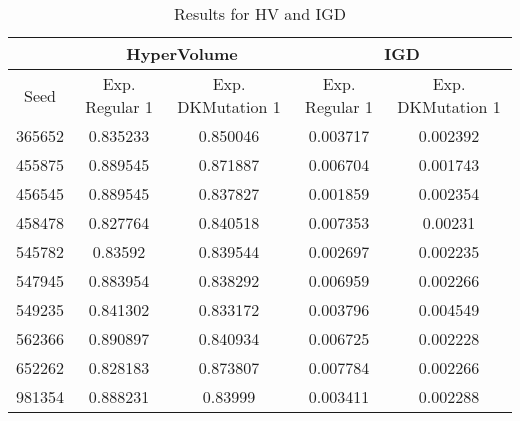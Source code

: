 \documentclass{article}
\begin{document}
 \begin{table}[h]
\caption{Results for HV and IGD}
 \label{table:result HV and IGD}
 
\begin{tabular}{c|cc|cc}  \hline
\multicolumn{1}{l}{} & \multicolumn{2}{c}{HyperVolume}    & \multicolumn{2}{c}{IGD}           \\ \hline 
Seed                 & Exp. Regular 1 & Exp. DKMutation 1 & Exp. Regular 1 & Exp. DKMutation 1 \\ \hline
365652               &  0.835233       & \cellcolor[gray]{0.7}0.850046          & 0.003717       & \cellcolor[gray]{0.7}0.002392          \\
455875               & \cellcolor[gray]{0.7}0.889545       & 0.871887          & 0.006704       & \cellcolor[gray]{0.7}0.001743          \\
456545               & \cellcolor[gray]{0.7}0.889545       & 0.837827          &\cellcolor[gray]{0.7} 0.001859       & 0.002354          \\
458478               & 0.827764       & \cellcolor[gray]{0.7}0.840518          & 0.007353       & \cellcolor[gray]{0.7}0.00231           \\
545782               & 0.83592        & \cellcolor[gray]{0.7} 0.839544          & 0.002697       & \cellcolor[gray]{0.7}0.002235          \\
547945               & \cellcolor[gray]{0.7}0.883954       & 0.838292          & 0.006959       & \cellcolor[gray]{0.7}0.002266          \\
549235               & \cellcolor[gray]{0.7}0.841302       & 0.833172          & \cellcolor[gray]{0.7}0.003796       & 0.004549          \\
562366               & \cellcolor[gray]{0.7}0.890897       & 0.840934          & 0.006725       & \cellcolor[gray]{0.7}0.002228          \\
652262               & 0.828183       & \cellcolor[gray]{0.7}0.873807          & 0.007784       & \cellcolor[gray]{0.7}0.002266          \\
981354               & \cellcolor[gray]{0.7}0.888231       & 0.83999           & 0.003411       & \cellcolor[gray]{0.7}0.002288    \\ \hline    
\end{tabular}
\end{table}
\end{document}

